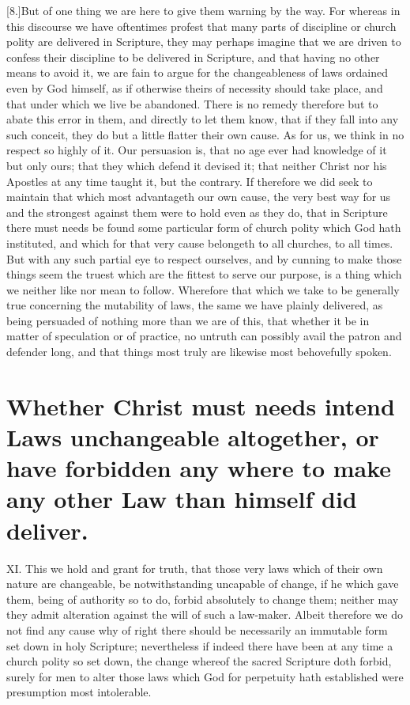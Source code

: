 [8.]But of one thing we are here to give them warning by the way. For whereas in this discourse we have oftentimes profest that many parts of discipline or church polity are delivered in Scripture, they may perhaps imagine that we are driven to confess their discipline to be delivered in Scripture, and that having no other means to avoid it, we are fain to argue for the changeableness of laws ordained even by God himself, as if otherwise theirs of necessity should take place, and that under which we live be abandoned. There is no remedy therefore but to abate this error in them, and directly to let them know, that if they fall into any such conceit, they do but a little flatter their own cause. As for us, we think in no respect so highly of it. Our persuasion is, that no age ever had knowledge of it but only ours; that they which defend it devised it; that neither Christ nor his Apostles at any time taught it, but the contrary. If therefore we did seek to maintain that which most advantageth our own cause, the very best way for us and the strongest against them were to hold even as they do, that in Scripture there must needs be found some particular form of church polity which God hath instituted, and which for that very  cause belongeth to all churches, to all times. But with any such partial eye to respect ourselves, and by cunning to make those things seem the truest which are the fittest to serve our purpose, is a thing which we neither like nor mean to follow. Wherefore that which we take to be generally true concerning the mutability of laws, the same we have plainly delivered, as being persuaded of nothing more than we are of this, that whether it be in matter of speculation or of practice, no untruth can possibly avail the patron and defender long, and that things most truly are likewise most behovefully spoken.

\section*{Whether Christ must needs intend Laws unchangeable altogether, or have forbidden any where to make any other Law than himself did deliver.}

XI. This we hold and grant for truth, that those very laws which of their own nature are changeable, be notwithstanding uncapable of change, if he which gave them, being of authority so to do, forbid absolutely to change them; neither may they admit alteration against the will of such a law-maker. Albeit therefore we do not find any cause why of right there should be necessarily an immutable form set down in holy Scripture; nevertheless if indeed there have been at any time a church polity so set down, the change whereof the sacred Scripture doth forbid, surely for men to alter those laws which God for perpetuity hath established were presumption most intolerable.


